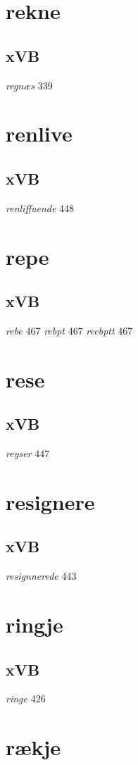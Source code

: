 \documentclass[a4paper,twocolumn]{article}
\begin{document}
\section{rekne}
\label{sec:org818972a}
\subsection{xVB}
\label{sec:org0bbc70a}
\emph{regnæs} 339 
\section{renlive}
\label{sec:orgb3897fa}
\subsection{xVB}
\label{sec:org032512c}
\emph{renliffuende} 448 
\section{repe}
\label{sec:org32a45ef}
\subsection{xVB}
\label{sec:orgae072ae}
\emph{rebe} 467 \emph{rebpt} 467 \emph{reebptt} 467 
\section{rese}
\label{sec:org4813b69}
\subsection{xVB}
\label{sec:org85fb7e3}
\emph{reyser} 447 
\section{resignere}
\label{sec:orgce3cd8c}
\subsection{xVB}
\label{sec:org256f1ee}
\emph{resignnerede} 443 
\section{ringje}
\label{sec:org809421e}
\subsection{xVB}
\label{sec:org195a615}
\emph{ringe} 426 
\section{rækje}
\label{sec:org9c283c2}
\end{document}
